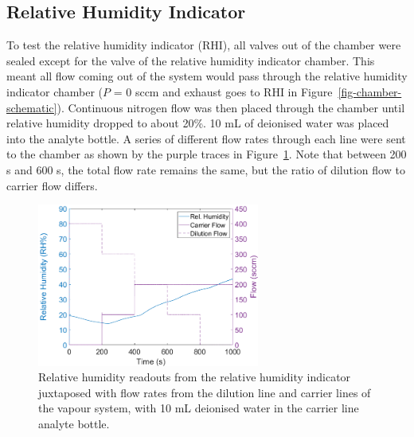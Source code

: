 \documentclass[
  a4paper,
]{scrbook}
\begin{document}
\hypertarget{relative-humidity-indicator}{%
\subsection{Relative Humidity
Indicator}\label{relative-humidity-indicator}}

To test the relative humidity indicator (RHI), all valves out of the
chamber were sealed except for the valve of the relative humidity
indicator chamber. This meant all flow coming out of the system would
pass through the relative humidity indicator chamber (\(P\) = 0 sccm and
exhaust goes to RHI in Figure~\ref{fig-chamber-schematic}). Continuous
nitrogen flow was then placed through the chamber until relative
humidity dropped to about 20\%. 10 mL of deionised water was placed into
the analyte bottle. A series of different flow rates through each line
were sent to the chamber as shown by the purple traces in
Figure~\ref{fig-RHI-verification}. Note that between 200 s and 600 s,
the total flow rate remains the same, but the ratio of dilution flow to
carrier flow differs.

\begin{figure}

{\centering \includegraphics[width=0.65\textwidth,height=\textheight]{figures/ch9/RHI_verification.png}

}

\caption[Relative humidity readouts from the relative humidity indicator
juxtaposed with flow rates from the dilution line and carrier lines of
the vapour system.]{\label{fig-RHI-verification}Relative humidity
readouts from the relative humidity indicator juxtaposed with flow rates
from the dilution line and carrier lines of the vapour system, with 10
mL deionised water in the carrier line analyte bottle.}

\end{figure}
\end{document}
